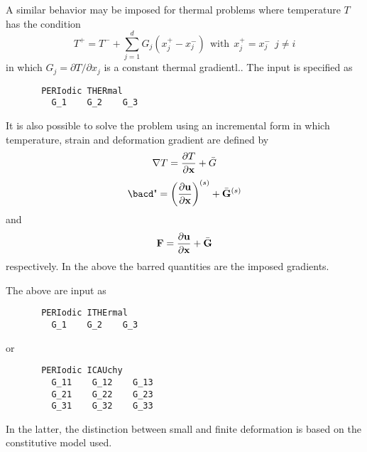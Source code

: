 A similar behavior may be imposed for thermal problems where temperature $T$
has the condition
\begin{displaymath}
T^+ = T^- + \sum_{j=1}^d  G_j ( x_j^+ - x_j^-)
~~\mbox{with}~~ x_j^+ = x_j^- ~~ j \ne i
\end{displaymath}
in which $G_j = \partial T/\partial x_j$ is a constant thermal gradientl..
The input is specified as
\begin{verbatim}
       PERIodic THERmal
         G_1    G_2    G_3
\end{verbatim}

It is also possible to solve the problem using an incremental form in which
temperature, strain and deformation gradient are defined by
\begin{displaymath}
\nabla T = \frac{\partial {T}}{\partial {\mathbf{x}}} + \bar{G}
\end{displaymath}
\begin{displaymath}
\bepsilon = \left( \dpdif{\B{u}}{\B{x}} \right)^{(s)} + \bar{\B{G}}^{(s)}
\end{displaymath}
and
\begin{displaymath}
\mathbf{F} = \frac{\partial {\mathbf{u}}}{\partial {\mathbf{x}}} + \bar{\mathbf{G}}
\end{displaymath}
respectively. In the above the barred quantities are the imposed gradients.

The above are input as
\begin{verbatim}
       PERIodic ITHErmal
         G_1    G_2    G_3
\end{verbatim}
or
\begin{verbatim}
       PERIodic ICAUchy
         G_11    G_12    G_13
         G_21    G_22    G_23
         G_31    G_32    G_33
\end{verbatim}
In the latter, the distinction between small and finite deformation is
based on the constitutive model used.

\vfil\eject
